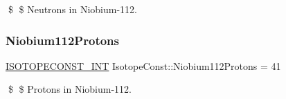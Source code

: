 \$ \$ Neutrons in Niobium-\/112. \mbox{\label{group___isotope_const-_niobium-_nb112_gaf620512abbc8eaf4c5166a095dcbd4bd}} 
\subsubsection{\texorpdfstring{Niobium112\+Protons}{Niobium112Protons}}
{\footnotesize\ttfamily \mbox{\hyperlink{group___isotope_const-_macros_ga5f18360b3e99483a35c32d789e62621c}{I\+S\+O\+T\+O\+P\+E\+C\+O\+N\+S\+T\+\_\+\+I\+NT}} Isotope\+Const\+::\+Niobium112\+Protons = 41}

\$ \$ Protons in Niobium-\/112. 